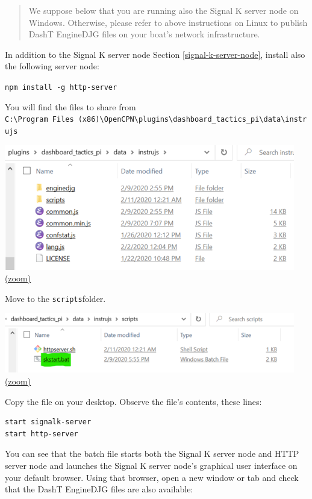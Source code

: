\documentclass[11pt]{article}
\begin{document}
    \begin{quote}
We suppose below that you are running also the Signal K server node on
Windows. Otherwise, please refer to above instructions on Linux to
publish DashT EngineDJG files on your boat's network infrastructure.
\end{quote}

    In addition to the Signal K server node
Section \ref{signal-k-server-node}, install also the following server
node:

    \texttt{npm\ install\ -g\ http-server}

    You will find the files to share from
\texttt{C:\textbackslash{}Program\ Files\ (x86)\textbackslash{}OpenCPN\textbackslash{}plugins\textbackslash{}dashboard\_tactics\_pi\textbackslash{}data\textbackslash{}instrujs}

    \includegraphics{2020-02-15_Windows_Explorer_instrujs_dir.png}
\href{img/2020-02-15_Windows_Explorer_instrujs_dir.png}{(zoom)}

    Move to the \texttt{scripts}folder.

    \includegraphics{2020-02-15_Windows_Explorer_scripts_dir.png}
\href{img/2020-02-15_Windows_Explorer_scripts_dir.png}{(zoom)}

    Copy the file on your desktop. Observe the file's contents, these lines:

    \begin{verbatim}
start signalk-server
start http-server
\end{verbatim}

    You can see that the batch file starts both the Signal K server node and
HTTP server node and launches the Signal K server node's graphical user
interface on your default browser. Using that browser, open a new window
or tab and check that the DashT EngineDJG files are also available:
\end{document}

